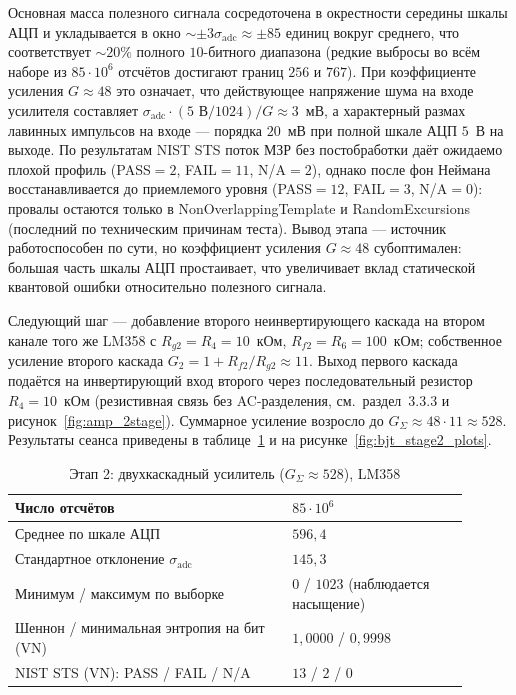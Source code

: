 Основная масса полезного сигнала сосредоточена в окрестности середины шкалы
АЦП и укладывается в окно ${\sim}\pm 3\sigma_\mathrm{adc}\approx\pm 85$ единиц
вокруг среднего, что соответствует ${\sim}20\%$ полного $10$-битного диапазона
(редкие выбросы во всём наборе из $85\cdot 10^6$ отсчётов достигают границ $256$
и $767$). При коэффициенте усиления $G\approx 48$ это означает, что
действующее напряжение шума на входе усилителя составляет
$\sigma_\mathrm{adc}\cdot(5\text{ В}/1024)/G\approx 3$~мВ, а характерный размах
лавинных импульсов на входе --- порядка $20$~мВ при полной шкале АЦП $5$~В на
выходе. По результатам NIST STS поток МЗР без постобработки даёт ожидаемо плохой
профиль (PASS${}=2$, FAIL${}=11$, N/A${}=2$), однако после фон Неймана
восстанавливается до приемлемого уровня (PASS${}=12$, FAIL${}=3$, N/A${}=0$):
провалы остаются только в NonOverlapping\-Template и RandomExcursions
(последний по техническим причинам теста). Вывод этапа --- источник
работоспособен по сути, но коэффициент усиления $G\approx 48$ субоптимален:
большая часть шкалы АЦП простаивает, что увеличивает вклад статической квантовой
ошибки относительно полезного сигнала.


Следующий шаг --- добавление второго неинвертирующего каскада на втором канале
того же LM358 с $R_{g2}=R_4=10$~кОм, $R_{f2}=R_6=100$~кОм; собственное усиление
второго каскада $G_2=1+R_{f2}/R_{g2}\approx 11$. Выход первого каскада подаётся
на инвертирующий вход второго через последовательный резистор $R_4=10$~кОм
(резистивная связь без AC-разделения, см.~раздел~3.3.3 и рисунок~\ref{fig:amp_2stage}).
Суммарное усиление возросло до $G_\Sigma\approx 48\cdot 11\approx 528$.
Результаты сеанса приведены в таблице~\ref{tab:bjt_stage2_summary} и на
рисунке~\ref{fig:bjt_stage2_plots}.

\begin{table}[H]
  \centering
  \footnotesize
  \caption{Этап 2: двухкаскадный усилитель ($G_\Sigma\approx 528$), LM358}
  \label{tab:bjt_stage2_summary}
  \begin{tabular}{|p{0.55\linewidth}|p{0.35\linewidth}|}
    \hline
    Число отсчётов & $85\cdot 10^6$ \\
    \hline
    Среднее по шкале АЦП & $596{,}4$ \\
    \hline
    Стандартное отклонение $\sigma_\mathrm{adc}$ & $145{,}3$ \\
    \hline
    Минимум / максимум по выборке & $0$ / $1023$ (наблюдается насыщение) \\
    \hline
    Шеннон / минимальная энтропия на бит (VN) & $1{,}0000$ / $0{,}9998$ \\
    \hline
    NIST STS (VN): PASS / FAIL / N/A & $13$ / $2$ / $0$ \\
    \hline
  \end{tabular}
\end{table}

